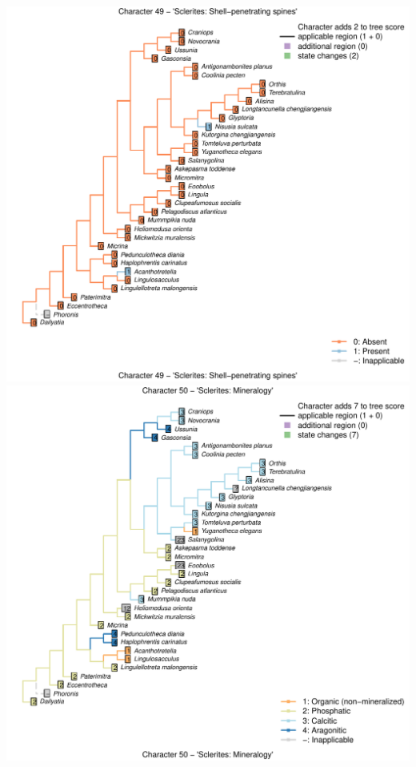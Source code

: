\documentclass[]{book}
\theoremstyle{definition}
\theoremstyle{definition}
\theoremstyle{definition}
\theoremstyle{remark}
\begin{document}
\includegraphics{Brachiopod_phylogeny_files/figure-latex/unnamed-chunk-4-49.pdf}
\includegraphics{Brachiopod_phylogeny_files/figure-latex/unnamed-chunk-4-50.pdf}
\end{document}
